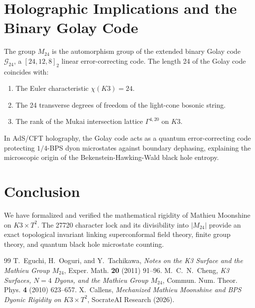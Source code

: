 \documentclass[11pt,a4paper]{article}
\begin{document}
\section{Holographic Implications and the Binary Golay Code}
The group $M_{24}$ is the automorphism group of the extended binary Golay code $\mathcal{G}_{24}$, a $[24, 12, 8]_2$ linear error-correcting code. The length 24 of the Golay code coincides with:
\begin{enumerate}
    \item The Euler characteristic $\chi(K3) = 24$.
    \item The 24 transverse degrees of freedom of the light-cone bosonic string.
    \item The rank of the Mukai intersection lattice $\Gamma^{4,20}$ on $K3$.
\end{enumerate}
In AdS/CFT holography, the Golay code acts as a quantum error-correcting code protecting $1/4$-BPS dyon microstates against boundary dephasing, explaining the microscopic origin of the Bekenstein-Hawking-Wald black hole entropy.

\section{Conclusion}
We have formalized and verified the mathematical rigidity of Mathieu Moonshine on $K3 \times T^2$. The 27720 character lock and its divisibility into $|M_{24}|$ provide an exact topological invariant linking superconformal field theory, finite group theory, and quantum black hole microstate counting.

\begin{thebibliography}{99}
 T.~Eguchi, H.~Ooguri, and Y.~Tachikawa, \emph{Notes on the K3 Surface and the Mathieu Group $M_{24}$}, Exper. Math. \textbf{20} (2011) 91--96.
 M.~C.~N.~Cheng, \emph{K3 Surfaces, $N=4$ Dyons, and the Mathieu Group $M_{24}$}, Commun. Num. Theor. Phys. \textbf{4} (2010) 623--657.
 X.~Callens, \emph{Mechanized Mathieu Moonshine and BPS Dyonic Rigidity on $K3 \times T^2$}, SocrateAI Research (2026).
\end{thebibliography}
\end{document}
